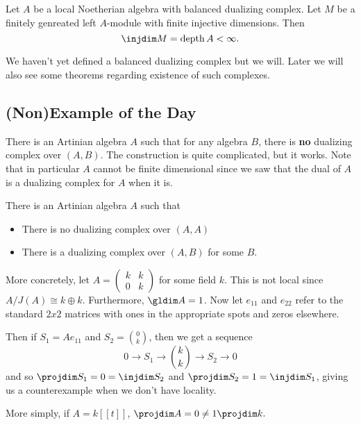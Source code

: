 \documentclass[12pt]{article}
\begin{document}
\begin{thm}[Bass]
	Let $A$ be a local Noetherian algebra with balanced dualizing complex. Let $M$ be a finitely genreated left $A$-module with finite injective 
	dimensions. Then 
	\[\injdim M=\operatorname{depth}A<\infty.\]
\end{thm}
\begin{rmk}
	We haven't yet defined a balanced dualizing complex but we will. Later we will also see some theorems regarding 
	existence of such complexes.
\end{rmk}

\subsection{(Non)Example of the Day}
\begin{ex}
	There is an Artinian algebra $A$ such that for any algebra $B$, there is \textbf{no} dualizing complex over $(A,B)$. The construction 
	is quite complicated, but it works. Note that in particular $A$ cannot be finite dimensional since we saw that 
	the dual of $A$  is a dualizing complex for $A$ when it is.
\end{ex}
\begin{ex}
	There is an Artinian algebra $A$ such that
	\begin{itemize}
		\item There is no dualizing complex over $(A,A)$
		\item There is a dualizing complex over $(A,B)$ for some $B$.
	\end{itemize}
\end{ex}
\begin{ex}
	More concretely, let $A=(\begin{smallmatrix}k&k\\0 &k\end{smallmatrix})$ for some field $k$. This is not local since $A/J(A)\cong k\oplus k$.
	Furthermore, $\gldim A=1$. Now let $e_{11}$ and $e_{22}$ refer to the standard $2x2$ matrices with ones in the appropriate spots and zeros elsewhere.

	Then if $S_1=Ae_{11}$ and $S_2=\binom{0}{k}$, then we get a sequence 
	\[0\to S_1\to\binom{k}{k}\to S_2\to 0\]
	and so $\projdim S_1=0=\injdim S_2$ and $\projdim S_2=1=\injdim S_1$, giving us a counterexample when we don't have locality.
\end{ex}
\begin{ex}
	More simply, if $A=k[[t]]$, $\projdim A=0\ne1\projdim k.$
\end{ex}
\end{document}
